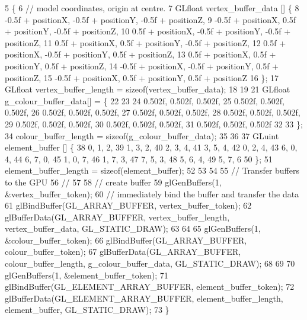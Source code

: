 \begin{DoxyCode}
5                                                                            \{
6   \textcolor{comment}{// model coordinates, origin at centre.}
7   GLfloat vertex\_buffer\_data [] \{
8         -0.5f + positionX, -0.5f + positionY, -0.5f + positionZ,
9         -0.5f + positionX,  0.5f + positionY, -0.5f + positionZ,
10          0.5f + positionX, -0.5f + positionY, -0.5f + positionZ,
11          0.5f + positionX,  0.5f + positionY, -0.5f + positionZ,
12          0.5f + positionX, -0.5f + positionY,  0.5f + positionZ,
13          0.5f + positionX,  0.5f + positionY,  0.5f + positionZ,
14         -0.5f + positionX, -0.5f + positionY,  0.5f + positionZ,
15         -0.5f + positionX,  0.5f + positionY,  0.5f + positionZ
16   \};
17   GLfloat vertex\_buffer\_length = \textcolor{keyword}{sizeof}(vertex\_buffer\_data);
18 
19 
21    GLfloat g\_colour\_buffer\_data[] = \{
22 
23 
24         0.502f, 0.502f, 0.502f,
25         0.502f, 0.502f, 0.502f,
26         0.502f, 0.502f, 0.502f,
27         0.502f, 0.502f, 0.502f,
28         0.502f, 0.502f, 0.502f,
29         0.502f, 0.502f, 0.502f,
30         0.502f, 0.502f, 0.502f,
31         0.502f, 0.502f, 0.502f
32 
33   \};
34     colour\_buffer\_length = \textcolor{keyword}{sizeof}(g\_colour\_buffer\_data);
35 
36 
37   GLuint element\_buffer []  \{
38         0, 1, 2,
39         1, 3, 2,
40         2, 3, 4,
41         3, 5, 4,
42         0, 2, 4,
43         6, 0, 4,
44         6, 7, 0,
45         1, 0, 7,
46         1, 7, 3,
47         7, 5, 3,
48         5, 6, 4,
49         5, 7, 6
50   \};
51   element\_buffer\_length = \textcolor{keyword}{sizeof}(element\_buffer);
52 
53 
54 
55   \textcolor{comment}{// Transfer buffers to the GPU}
56   \textcolor{comment}{//}
57 
58   \textcolor{comment}{// create buffer}
59   glGenBuffers(1, &vertex\_buffer\_token);
60   \textcolor{comment}{// immediately bind the buffer and transfer the data}
61   glBindBuffer(GL\_ARRAY\_BUFFER, vertex\_buffer\_token);
62   glBufferData(GL\_ARRAY\_BUFFER, vertex\_buffer\_length, vertex\_buffer\_data, GL\_STATIC\_DRAW);
63 
64 
65     glGenBuffers(1, &colour\_buffer\_token);
66     glBindBuffer(GL\_ARRAY\_BUFFER, colour\_buffer\_token);
67     glBufferData(GL\_ARRAY\_BUFFER, colour\_buffer\_length, g\_colour\_buffer\_data, GL\_STATIC\_DRAW);
68 
69 
70   glGenBuffers(1, &element\_buffer\_token);
71   glBindBuffer(GL\_ELEMENT\_ARRAY\_BUFFER, element\_buffer\_token);
72   glBufferData(GL\_ELEMENT\_ARRAY\_BUFFER, element\_buffer\_length, element\_buffer, GL\_STATIC\_DRAW);
73 \}
\end{DoxyCode}
\hypertarget{classCubeAsset_ab3ab9a5da82cbf8537a28652410093b1}{}
